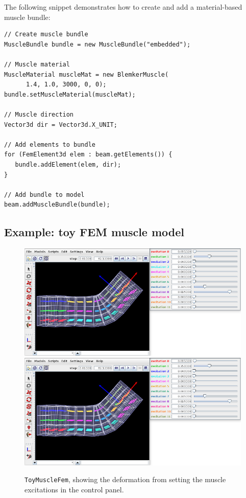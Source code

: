 The following snippet demonstrates how to create and add a material-based
muscle bundle:
\lstset{numbers=left}
\begin{lstlisting}[]
// Create muscle bundle
MuscleBundle bundle = new MuscleBundle("embedded");

// Muscle material
MuscleMaterial muscleMat = new BlemkerMuscle(
      1.4, 1.0, 3000, 0, 0);
bundle.setMuscleMaterial(muscleMat); 

// Muscle direction
Vector3d dir = Vector3d.X_UNIT;

// Add elements to bundle
for (FemElement3d elem : beam.getElements()) {
   bundle.addElement(elem, dir);
}

// Add bundle to model      
beam.addMuscleBundle(bundle);
\end{lstlisting}
\lstset{numbers=none}

\subsection{Example: toy FEM muscle model}
\label{ToyMuscleFem:sec}

\begin{figure}[ht]
\begin{center}
\iflatexml
   \includegraphics[]{images/ToyMuscleFem}
\else
   \includegraphics[width=6in]{images/ToyMuscleFem}
\fi
\end{center}
\caption{{\tt ToyMuscleFem}, showing the deformation from setting
the muscle excitations in the control panel.}
\label{ToyMuscleFem:fig}
\end{figure}

